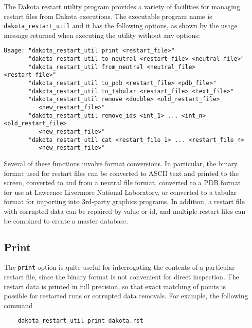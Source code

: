 The Dakota restart utility program provides a variety of facilities
for managing restart files from Dakota executions. The executable
program name is \texttt{dakota\_restart\_util} and it has the
following options, as shown by the usage message returned when
executing the utility without any options:
\begin{small}
\begin{verbatim}
Usage: "dakota_restart_util print <restart_file>"
       "dakota_restart_util to_neutral <restart_file> <neutral_file>"
       "dakota_restart_util from_neutral <neutral_file> <restart_file>"
       "dakota_restart_util to_pdb <restart_file> <pdb_file>"
       "dakota_restart_util to_tabular <restart_file> <text_file>"
       "dakota_restart_util remove <double> <old_restart_file>
          <new_restart_file>"
       "dakota_restart_util remove_ids <int_1> ... <int_n> <old_restart_file>
          <new_restart_file>"
       "dakota_restart_util cat <restart_file_1> ... <restart_file_n>
          <new_restart_file>"
\end{verbatim}
\end{small}

Several of these functions involve format conversions. In particular,
the binary format used for restart files can be converted to ASCII
text and printed to the screen, converted to and from a neutral file
format, converted to a PDB format for use at Lawrence Livermore
National Laboratory, or converted to a tabular format for importing
into 3rd-party graphics programs. In addition, a restart file with
corrupted data can be repaired by value or id, and multiple restart
files can be combined to create a master database.

\subsection{Print}\label{restart:utility:print}

The \texttt{print} option is quite useful for interrogating the
contents of a particular restart file, since the binary format is not
convenient for direct inspection. The restart data is printed in full
precision, so that exact matching of points is possible for restarted
runs or corrupted data removals. For example, the following command
\begin{small}
\begin{verbatim}
    dakota_restart_util print dakota.rst
\end{verbatim}
\end{small}

